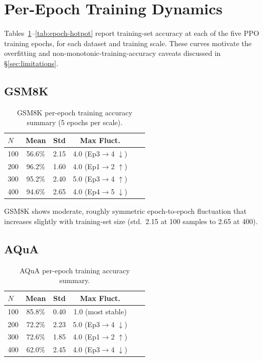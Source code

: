 \documentclass[11pt]{article}
\begin{document}
\section{Per-Epoch Training Dynamics}
\label{app:epoch-curves}

Tables~\ref{tab:epoch-gsm8k}--\ref{tab:epoch-hotpot} report training-set
accuracy at each of the five PPO training epochs, for each dataset and
training scale. These curves motivate the overfitting and
non-monotonic-training-accuracy caveats discussed in
\S\ref{sec:limitations}.

\subsection{GSM8K}

\begin{table}[H]
\centering
\small
\begin{tabular}{lccccc}
\toprule
$N$ & Mean & Std & Max Fluct. \\
\midrule
100 & 56.6\% & 2.15 & 4.0 (Ep3$\to$4 $\downarrow$) \\
200 & 96.2\% & 1.60 & 4.0 (Ep1$\to$2 $\uparrow$) \\
300 & 95.2\% & 2.40 & 5.0 (Ep3$\to$4 $\uparrow$) \\
400 & 94.6\% & 2.65 & 4.0 (Ep4$\to$5 $\downarrow$) \\
\bottomrule
\end{tabular}
\caption{GSM8K per-epoch training accuracy summary (5 epochs per scale).}
\label{tab:epoch-gsm8k}
\end{table}

GSM8K shows moderate, roughly symmetric epoch-to-epoch fluctuation that
increases slightly with training-set size (std.\ 2.15 at 100 samples to 2.65
at 400).

\subsection{AQuA}

\begin{table}[H]
\centering
\small
\begin{tabular}{lccccc}
\toprule
$N$ & Mean & Std & Max Fluct. \\
\midrule
100 & 85.8\% & 0.40 & 1.0 (most stable) \\
200 & 72.2\% & 2.23 & 5.0 (Ep3$\to$4 $\downarrow$) \\
300 & 72.6\% & 1.85 & 4.0 (Ep1$\to$2 $\uparrow$) \\
400 & 62.0\% & 2.45 & 4.0 (Ep3$\to$4 $\downarrow$) \\
\bottomrule
\end{tabular}
\caption{AQuA per-epoch training accuracy summary.}
\label{tab:epoch-aqua}
\end{table}
\end{document}

